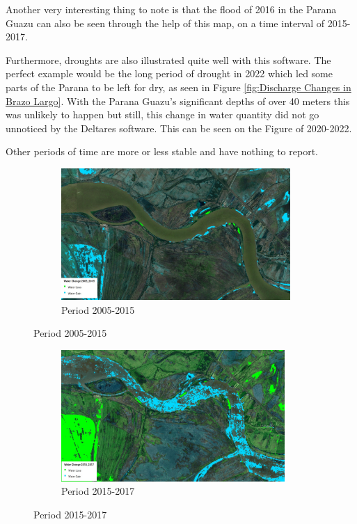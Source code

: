 Another very interesting thing to note is that the flood of 2016 in the Parana Guazu can also be seen through the help of this map, on a time interval of 2015-2017.

Furthermore, droughts are also illustrated quite well with this software. The perfect example would be the long period of drought in 2022 which led some parts of the Parana to be left for dry, as seen in Figure \ref{fig:Discharge Changes in Brazo Largo}. With the Parana Guazu's significant depths of over 40 meters this was unlikely to happen but still, this change in water quantity did not go unnoticed by the Deltares software. This can be seen on the Figure of 2020-2022.

Other periods of time are more or less stable and have nothing to report.

\begin{figure}[H]
    \centering
    \begin{subfigure}[a]{0.6\textwidth}
        \includegraphics[width=\linewidth, height=5cm]{figures/ch5/2005-2015.jpg}
        \caption{Period 2005-2015}
        \label{fig:Period 2005-2015}
    \end{subfigure}
\end{figure}

\begin{figure}[H]
    \centering
    \begin{subfigure}[b]{0.6\textwidth}
        \includegraphics[width=\linewidth, height=5cm]{figures/ch5/2015-2017.jpg}
        \caption{Period 2015-2017}
        \label{fig:Period 2015-2017}
    \end{subfigure}
\end{figure}

